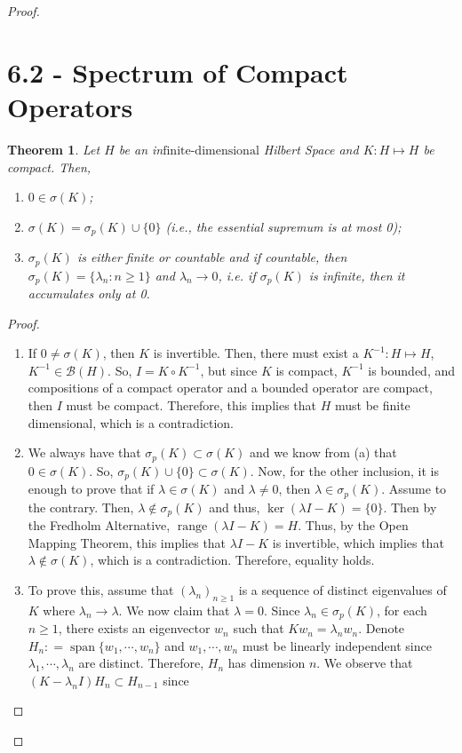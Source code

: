 \documentclass[oneside]{book}
\newtheorem{theorem}{Theorem}
\newcommand{\B}{\mathscr{B}}
\newcommand{\fd}{{\text{finite-dimensional}}}
\DeclareMathOperator{\range}{range}
\newcommand{\sbs}{\subset}
\DeclareMathOperator*{\spa}{span}
\begin{document}
\begin{proof}
\section*{6.2 - Spectrum of Compact Operators}
\begin{theorem}
Let $H$ be an in$\fd$ Hilbert Space and $K: H \mapsto H$ be compact. Then,
\begin{enumerate}
\item[(a)] $0 \in \sigma(K)$;
\item[(b)] $\sigma(K) = \sigma_p(K) \cup \{ 0 \}$ (i.e., the essential supremum is at most 0);
\item[(c)] $\sigma_p(K)$ is either finite or countable and if countable, then $\sigma_p(K) = \{ \lambda_n : n \geq 1\}$ and $\lambda_n \to 0$, i.e. if $\sigma_p(K)$ is infinite, then it accumulates only at 0. 
\end{enumerate}
\end{theorem}
\begin{proof}
\begin{enumerate}
\item[(a)] If $0 \neq \sigma(K)$, then $K$ is invertible. Then, there must exist a $K^{-1} : H \mapsto H$, $K^{-1} \in \B(H)$. So, $I = K \circ K^{-1}$, but since $K$ is compact, $K^{-1}$ is bounded, and compositions of a compact operator and a bounded operator are compact, then $I$ must be compact. Therefore, this implies that $H$ must be finite dimensional, which is a contradiction. 
\item[(b)] We always have that $\sigma_p(K) \sbs \sigma(K)$ and we know from (a) that $0 \in \sigma(K)$. So, $\sigma_p(K) \cup \{ 0 \} \sbs \sigma(K)$. Now, for the other inclusion, it is enough to prove that if $\lambda \in \sigma(K)$ and $\lambda \neq 0$, then $\lambda \in \sigma_p(K)$. Assume to the contrary. Then, $\lambda \not\in \sigma_p(K)$ and thus, $\ker(\lambda I - K) = \{ 0 \}$. Then by the Fredholm Alternative, $\range(\lambda I - K) = H$. Thus, by the Open Mapping Theorem, this implies that $\lambda I - K$ is invertible, which implies that $\lambda \not\in \sigma(K)$, which is a contradiction. Therefore, equality holds.
\item[(c)] To prove this, assume that $(\lambda_n)_{n \geq 1}$ is a sequence of distinct eigenvalues of $K$ where $\lambda_n \to \lambda$. We now claim that $\lambda = 0$. Since $\lambda_n \in \sigma_p(K)$, for each $n \geq 1$, there exists an eigenvector $w_n$ such that $K w_n = \lambda_n w_n$. Denote $H_n : = \spa\{ w_1, \cdots, w_n \}$ and $w_1, \cdots, w_n$ must be linearly independent since $\lambda_1, \cdots, \lambda_n$ are distinct. Therefore, $H_n$ has dimension $n$. We observe that $(K - \lambda_n I) H_n \sbs H_{n-1}$ since 

\end{enumerate}
\end{proof}
\end{proof}
\end{document}
